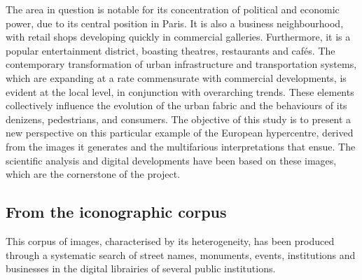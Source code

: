 \documentclass[12pt, a4paper, twocolumn]{article}
\begin{document}
The area in question is notable for its concentration of political and economic power, due to its central position in Paris. It is also a business neighbourhood, with retail shops developing quickly in commercial galleries. Furthermore, it is a popular entertainment district, boasting theatres, restaurants and cafés. The contemporary transformation of urban infrastructure and transportation systems, which are expanding at a rate commensurate with commercial developments, is evident at the local level, in conjunction with overarching trends. These elements collectively influence the evolution of the urban fabric and the behaviours of its denizens, pedestrians, and consumers. The objective of this study is to present a new perspective on this particular example of the European hypercentre, derived from the images it generates and the multifarious interpretations that ensue. The scientific analysis and digital developments have been based on these images, which are the cornerstone of the project.

\subsection{From the iconographic corpus}

This corpus of images, characterised by its heterogeneity, has been produced through a systematic search of street names, monuments, events, institutions and businesses in the digital librairies of several public institutions.
\end{document}
